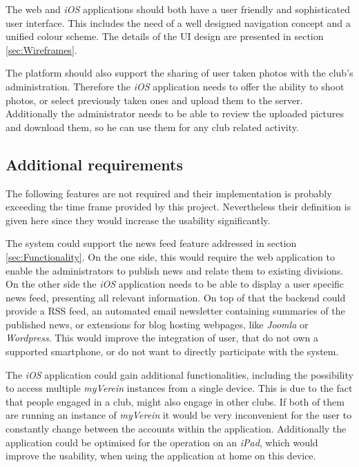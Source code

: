 The web and \emph{iOS} applications should both have a user friendly and sophisticated user interface. This includes the need of a well designed navigation concept and a unified colour scheme. The details of the \gls{UI} design are presented in section \vref{sec:Wireframes}. 

The platform should also support the sharing of user taken photos with the club's administration. Therefore the \emph{iOS} application needs to offer the ability to shoot photos, or select previously taken ones and upload them to the server. Additionally the administrator needs to be able to review the uploaded pictures and download them, so he can use them for any club related activity.

\subsection{Additional requirements}
\label{sec:AdditionalReq}

The following features are not required and their implementation is probably exceeding the time frame provided by this project. Nevertheless their definition is given here since they would increase the usability significantly. 

The system could support the news feed feature addressed in section \vref{sec:Functionality}. On the one side, this would require the web application to enable the administrators to publish news and relate them to existing divisions. On the other side the \emph{iOS} application needs to be able to display a user specific news feed, presenting all relevant information. On top of that the backend could provide a \gls{RSS} feed, an automated email newsletter containing summaries of the published news, or extensions for blog hosting webpages, like \emph{Joomla} or \emph{Wordpress}. This would improve the integration of user, that do not own a supported smartphone, or do not want to directly participate with the system.

The \emph{iOS} application could gain additional functionalities, including the possibility to access multiple \emph{myVerein} instances from a single device. This is due to the fact that people engaged in a club, might also engage in other clubs. If both of them are running an instance of \emph{myVerein} it would be very inconvenient for the user to constantly change between the accounts within the application. Additionally the application could be optimised for the operation on an \emph{iPad}, which would improve the usability, when using the application at home on this device.

